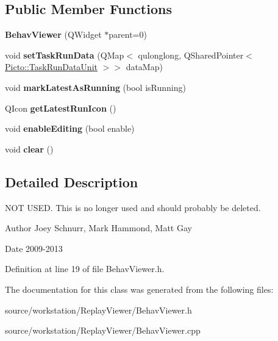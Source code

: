 \subsection*{Public Member Functions}
\begin{DoxyCompactItemize}
\item 
\hypertarget{class_behav_viewer_af2282df97acc5ff395be70a81cd6a928}{{\bfseries Behav\-Viewer} (Q\-Widget $\ast$parent=0)}\label{class_behav_viewer_af2282df97acc5ff395be70a81cd6a928}

\item 
\hypertarget{class_behav_viewer_a504f3f3bd282266fc1ab64c9b6a6027b}{void {\bfseries set\-Task\-Run\-Data} (Q\-Map$<$ qulonglong, Q\-Shared\-Pointer$<$ \hyperlink{class_picto_1_1_task_run_data_unit}{Picto\-::\-Task\-Run\-Data\-Unit} $>$$>$ data\-Map)}\label{class_behav_viewer_a504f3f3bd282266fc1ab64c9b6a6027b}

\item 
\hypertarget{class_behav_viewer_ab52ff50a0b48afe6abbda17e7613efa0}{void {\bfseries mark\-Latest\-As\-Running} (bool is\-Running)}\label{class_behav_viewer_ab52ff50a0b48afe6abbda17e7613efa0}

\item 
\hypertarget{class_behav_viewer_a3b94a294dd42a7c1233700adc222775b}{Q\-Icon {\bfseries get\-Latest\-Run\-Icon} ()}\label{class_behav_viewer_a3b94a294dd42a7c1233700adc222775b}

\item 
\hypertarget{class_behav_viewer_ab97c878495b43fb49aaa9feefe478d0d}{void {\bfseries enable\-Editing} (bool enable)}\label{class_behav_viewer_ab97c878495b43fb49aaa9feefe478d0d}

\item 
\hypertarget{class_behav_viewer_ae6178822533564f79c040f25e2d894ef}{void {\bfseries clear} ()}\label{class_behav_viewer_ae6178822533564f79c040f25e2d894ef}

\end{DoxyCompactItemize}


\subsection{Detailed Description}
N\-O\-T U\-S\-E\-D. This is no longer used and should probably be deleted. 

\begin{DoxyAuthor}{Author}
Joey Schnurr, Mark Hammond, Matt Gay 
\end{DoxyAuthor}
\begin{DoxyDate}{Date}
2009-\/2013 
\end{DoxyDate}


Definition at line 19 of file Behav\-Viewer.\-h.



The documentation for this class was generated from the following files\-:\begin{DoxyCompactItemize}
\item 
source/workstation/\-Replay\-Viewer/Behav\-Viewer.\-h\item 
source/workstation/\-Replay\-Viewer/Behav\-Viewer.\-cpp\end{DoxyCompactItemize}
